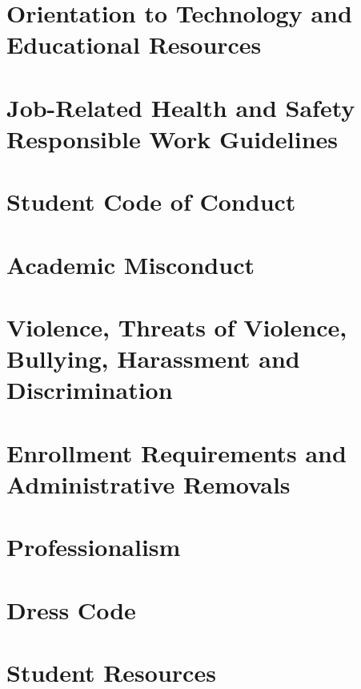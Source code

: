 \documentclass{article}
\begin{document}
\section*{Orientation to Technology and Educational Resources}
\bline


\section*{Job-Related Health and Safety Responsible Work Guidelines}
\bline


\section*{Student Code of Conduct}
\bline


\section*{Academic Misconduct}
\bline


\section*{Violence, Threats of Violence, Bullying, Harassment and Discrimination}
\bline


\section*{Enrollment Requirements and Administrative Removals}
\bline


\section*{Professionalism}
\bline


\section*{Dress Code}
\bline


\section*{Student Resources}
\bline

\end{document}
